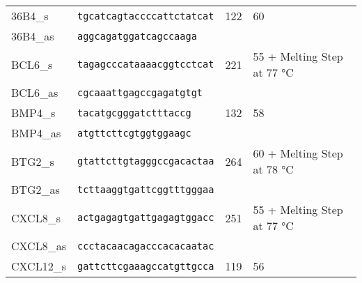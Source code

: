 \begin{spacing}{1}
{\begin{longtable}{|l|l|p{2cm}|p{2cm}|}
            \hline
            36B4\_s      & \texttt{tgcatcagtaccccattctatcat}                                                                                         & 122 & 60                         \\
            \hhline{--~~}
            36B4\_as     & \texttt{aggcagatggatcagccaaga}                                                                                            &     &                            \\
            \hhline{====}
            BCL6\_s      & \texttt{tagagcccataaaacggtcctcat}                                                                                         & 221 & 55 + Melting Step at 77 °C \\
            \hhline{--~~}
            BCL6\_as     & \texttt{cgcaaattgagccgagatgtgt}                                                                                           &     &                            \\
            \hhline{====}
            BMP4\_s      & \texttt{tacatgcgggatctttaccg}                                                                                             & 132 & 58                         \\
            \hhline{--~~}
            BMP4\_as     & \texttt{atgttcttcgtggtggaagc}                                                                                             &     &                            \\
            \hhline{====}
            BTG2\_s      & \texttt{gtattcttgtagggccgacactaa}                                                                                         & 264 & 60 + Melting Step at 78 °C \\
            \hhline{--~~}
            BTG2\_as     & \texttt{tcttaaggtgattcggtttgggaa}                                                                                         &     &                            \\
            \hhline{====}
            CXCL8\_s     & \texttt{actgagagtgattgagagtggacc}                                                                                         & 251 & 55 + Melting Step at 77 °C \\
            \hhline{--~~}
            CXCL8\_as    & \texttt{ccctacaacagacccacacaatac}                                                                                         &     &                            \\
            \hhline{====}
            CXCL12\_s    & \texttt{gattcttcgaaagccatgttgcca}                                                                                         & 119 & 56                         \\

\end{longtable}}
\end{spacing}
